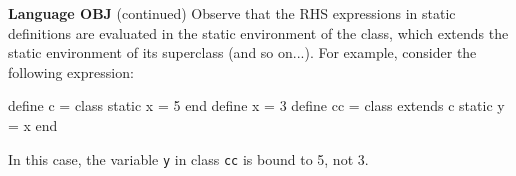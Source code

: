 \begin{minipage}[t]{\sw}
\slidenumber
\LARGE
{\bf Language OBJ} (continued)\exx
Observe that the RHS expressions in static definitions are evaluated
in the static environment of the class,
which extends the static environment of its superclass (and so on...).
For example, consider the following expression:
\begin{qv}
define c = class static x = 5 end
define x = 3
define cc =
  class extends c
    static y = x
  end
\end{qv}
In this case, the variable \verb'y'
in class \verb'cc' is bound to 5, not 3.
\end{minipage}

